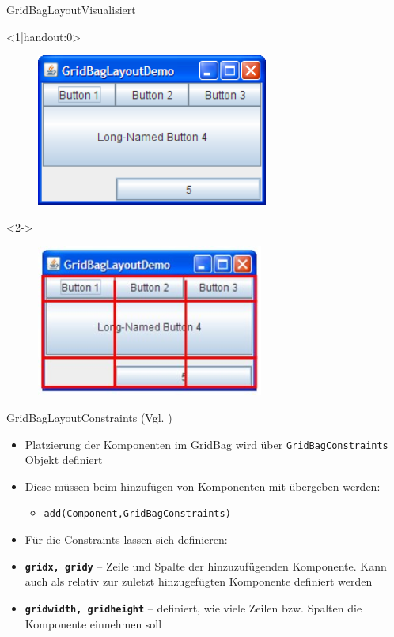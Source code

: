 \begin{frame}{GridBagLayout}{Visualisiert}
    \begin{onlyenv}<1|handout:0>
    \begin{figure}
        \includegraphics[height=5cm]{graph/gridbag}
        \caption*{\cite{orac:gridbaglayout}}
    \end{figure}
    \end{onlyenv}
    \begin{onlyenv}<2->
    \begin{figure}
        \includegraphics[height=5cm]{graph/gridbagline}
        \caption*{\cite{orac:gridbaglayout}}
    \end{figure}
    \end{onlyenv}
\end{frame}

\begin{frame}{GridBagLayout}{Constraints (Vgl. \cite{orac:gridbaglayout})}
    \begin{itemize}
        \item Platzierung der Komponenten im GridBag wird über \texttt{GridBagConstraints} Objekt definiert
        \item Diese müssen beim hinzufügen von Komponenten mit übergeben werden:
        \begin{itemize}
            \item \texttt{add(Component,GridBagConstraints)}
        \end{itemize}
        \item Für die Constraints lassen sich definieren:
        \item \textbf{\texttt{gridx, gridy}} -- Zeile und Spalte der hinzuzufügenden Komponente. Kann auch als relativ zur zuletzt hinzugefügten Komponente definiert werden
        \item \textbf{\texttt{gridwidth, gridheight}} -- definiert, wie viele Zeilen bzw. Spalten die Komponente einnehmen soll
    \end{itemize}
\end{frame}

